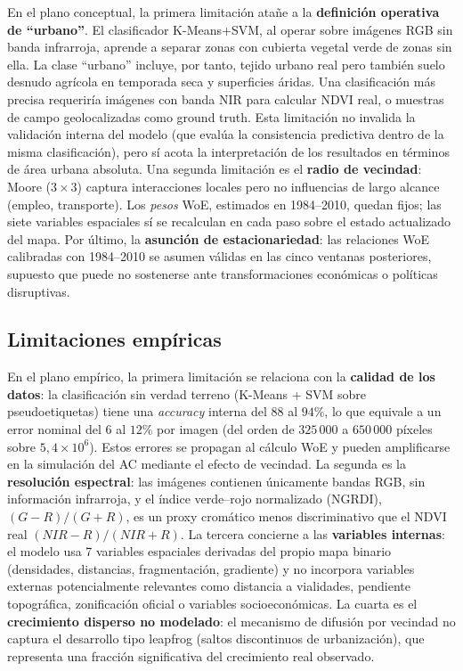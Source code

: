 En el plano conceptual, la primera limitación atañe a la \textbf{definición operativa de ``urbano''}. El clasificador K-Means+SVM, al operar sobre imágenes RGB sin banda infrarroja, aprende a separar zonas con cubierta vegetal verde de zonas sin ella. La clase ``urbano'' incluye, por tanto, tejido urbano real pero también suelo desnudo agrícola en temporada seca y superficies áridas. Una clasificación más precisa requeriría imágenes con banda NIR para calcular NDVI real, o muestras de campo geolocalizadas como ground truth. Esta limitación no invalida la validación interna del modelo (que evalúa la consistencia predictiva dentro de la misma clasificación), pero sí acota la interpretación de los resultados en términos de área urbana absoluta. Una segunda limitación es el \textbf{radio de vecindad}: Moore ($3 \times 3$) captura interacciones locales pero no influencias de largo alcance (empleo, transporte). Los \emph{pesos} WoE, estimados en 1984--2010, quedan fijos; las siete variables espaciales sí se recalculan en cada paso sobre el estado actualizado del mapa. Por último, la \textbf{asunción de estacionariedad}: las relaciones WoE calibradas con 1984--2010 se asumen válidas en las cinco ventanas posteriores, supuesto que puede no sostenerse ante transformaciones económicas o políticas disruptivas.

\subsection{Limitaciones empíricas}

En el plano empírico, la primera limitación se relaciona con la \textbf{calidad de los datos}: la clasificación sin verdad terreno (K-Means + SVM sobre pseudoetiquetas) tiene una \textit{accuracy} interna del $88$ al $94$\%, lo que equivale a un error nominal del $6$ al $12$\% por imagen (del orden de $325\,000$ a $650\,000$ píxeles sobre $5{,}4 \times 10^{6}$). Estos errores se propagan al cálculo WoE y pueden amplificarse en la simulación del AC mediante el efecto de vecindad. La segunda es la \textbf{resolución espectral}: las imágenes contienen únicamente bandas RGB, sin información infrarroja, y el índice verde--rojo normalizado (NGRDI), $(G-R)/(G+R)$, es un proxy cromático menos discriminativo que el NDVI real $(NIR-R)/(NIR+R)$. La tercera concierne a las \textbf{variables internas}: el modelo usa 7 variables espaciales derivadas del propio mapa binario (densidades, distancias, fragmentación, gradiente) y no incorpora variables externas potencialmente relevantes como distancia a vialidades, pendiente topográfica, zonificación oficial o variables socioeconómicas. La cuarta es el \textbf{crecimiento disperso no modelado}: el mecanismo de difusión por vecindad no captura el desarrollo tipo leapfrog (saltos discontinuos de urbanización), que representa una fracción significativa del crecimiento real observado.

